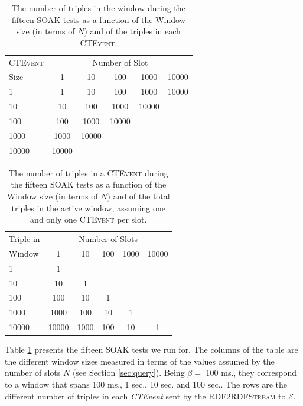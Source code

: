 \begin{table}[htb]
\centering
\normalsize
 \begin{tabular}{l| ccccc}
	  	\hline
		\textsc{CTEvent}  &\multicolumn{5}{c}{Number of Slot}  \\
		Size  & 1 & 10 & 100 & 1000&10000 \\
		\hline	
		1 & 1& 10 & 100 & 1000&10000 \\
		10  & 10 & 100 & 1000&10000 \\
		100 & 100&1000&10000  \\
		1000 &1000 & 10000 \\
		10000&10000  \\
		\hline 
	\end{tabular}
	 \vspace{10pt}
	\caption[SOAK Tests Summary Table]{The number of triples in the window during the fifteen SOAK tests as a function of the Window size (in terms of $N$) and of the triples in each \textsc{CTEvent}.}
	\label{tab:soaktests}
\end{table}

\begin{table}[htb]
	\centering
	\normalsize
	\begin{tabular}{l | ccccc} %
	  	\hline
		Triple in & \multicolumn{5}{c}{Number of Slots}  \\
		Window  & 1 & 10 & 100 & 1000&10000\\
		\hline
		1  	 & 1\\
		10   & 10  & 1 \\
		100  & 100 & 10 & 1\\
		1000 & 1000& 100& 10& 1\\
		10000& 10000 & 1000& 100& 10& 1\\
		\hline %
	 \end{tabular}
	\caption[SOAK Tests Summary Table Alternative Layout]{The number of triples in a \textsc{CTEvent} during the fifteen SOAK tests as a function of the Window size (in terms of $N$) and of the total triples in the active window, assuming one and only one \textsc{CTEvent} per slot.}
	\label{tab:soaktests-alt}
\end{table}

Table \ref{tab:soaktests} presents the fifteen SOAK tests we run for. The columns of the table are the different window sizes measured in terms of the values assumed by the number of slots $N$ (see Section \ref{sec:query}).  Being $\beta=$ 100 ms., they correspond to a window that spans 100 ms., 1 sec., 10 sec. and 100 sec.. The rows are the different number of triples in each \textit{CTEvent} sent by the \textsc{RDF2RDFStream} to $\mathcal{E}$.%


